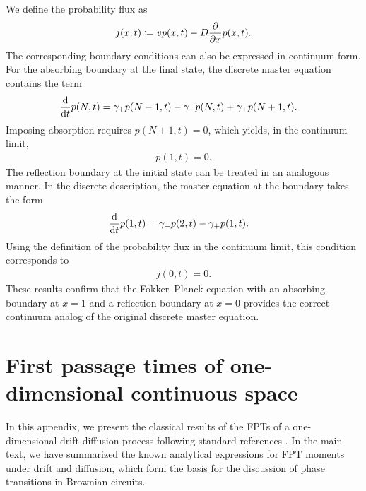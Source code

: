 \documentclass[%
 reprint,
superscriptaddress,
 amsmath,amssymb,
 aps,
 prx,
]{revtex4-2}
\begin{document}
We define the probability flux as 
\begin{align}
    j(x,t) \coloneqq v  p(x,t) - D \pdv{x} p(x,t). 
\end{align} 
The corresponding boundary conditions can also be expressed in continuum form.
For the absorbing boundary at the final state, the discrete master equation contains the term
\begin{align}
    \dv{t} p(N,t) &= \gamma_+ p(N-1,t) - \gamma_- p(N,t) + \gamma_+ p(N+1,t).
\end{align}
Imposing absorption requires $p(N+1,t)=0$, which yields, in the continuum limit, 
\begin{align}
    p(1,t) = 0 .
\end{align}
The reflection boundary at the initial state can be treated in an analogous manner. In the discrete description, the master equation at the boundary takes the form 
\begin{align}
    \dv{t} p(1,t) &= \gamma_- p(2,t) - \gamma_+ p(1,t). 
\end{align}
Using the definition of the probability flux in the continuum limit, this condition corresponds to 
\begin{align}
    j(0,t) = 0. 
\end{align}
These results confirm that the Fokker--Planck equation with an absorbing boundary at $x=1$ and a reflection boundary at $x=0$ provides the correct continuum analog of the original discrete master equation. 

\section{First passage times of one-dimensional continuous space}\label{appendix:FPT by FP}
In this appendix, we present the classical results of the FPTs of a one-dimensional drift-diffusion process following standard references \cite{Redner_2001,gardiner1985hsm}. 
In the main text, we have summarized the known analytical expressions for FPT moments under drift and diffusion, which form the basis for the discussion of phase transitions in Brownian circuits. 
\end{document}
